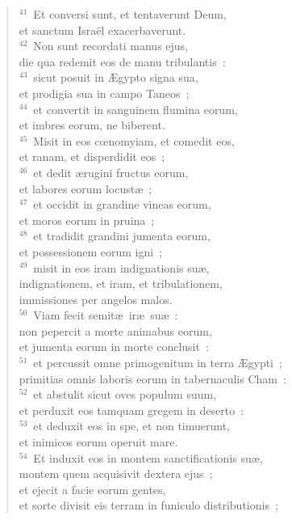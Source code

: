 \begin{flushleft}
\begin{verse}
${}^{41}$~Et conversi sunt, et tentaverunt Deum,\\ et sanctum Isra\"el exacerbaverunt.\\
${}^{42}$~Non sunt recordati manus ejus,\\ die qua redemit eos de manu tribulantis~:\\
${}^{43}$~sicut posuit in \AE gypto signa sua,\\ et prodigia sua in campo Taneos~;\\
${}^{44}$~et convertit in sanguinem flumina eorum,\\ et imbres eorum, ne biberent.\\
${}^{45}$~Misit in eos cœnomyiam, et comedit eos,\\ et ranam, et disperdidit eos~;\\
${}^{46}$~et dedit \ae rugini fructus eorum,\\ et labores eorum locust\ae~;\\
${}^{47}$~et occidit in grandine vineas eorum,\\ et moros eorum in pruina~;\\
${}^{48}$~et tradidit grandini jumenta eorum,\\ et possessionem eorum igni~;\\
${}^{49}$~misit in eos iram indignationis su\ae ,\\ indignationem, et iram, et tribulationem,\\ immissiones per angelos malos.\\
${}^{50}$~Viam fecit semit\ae\ ir\ae\ su\ae~:\\ non pepercit a morte animabus eorum,\\ et jumenta eorum in morte conclusit~:\\
${}^{51}$~et percussit omne primogenitum in terra \AE gypti~;\\ primitias omnis laboris eorum in tabernaculis Cham~:\\
${}^{52}$~et abstulit sicut oves populum suum,\\ et perduxit eos tamquam gregem in deserto~:\\
${}^{53}$~et deduxit eos in spe, et non timuerunt,\\ et inimicos eorum operuit mare.\\
${}^{54}$~Et induxit eos in montem sanctificationis su\ae ,\\ montem quem acquisivit dextera ejus~;\\ et ejecit a facie eorum gentes,\\ et sorte divisit eis terram in funiculo distributionis~;\\

\end{verse}
\end{flushleft}
